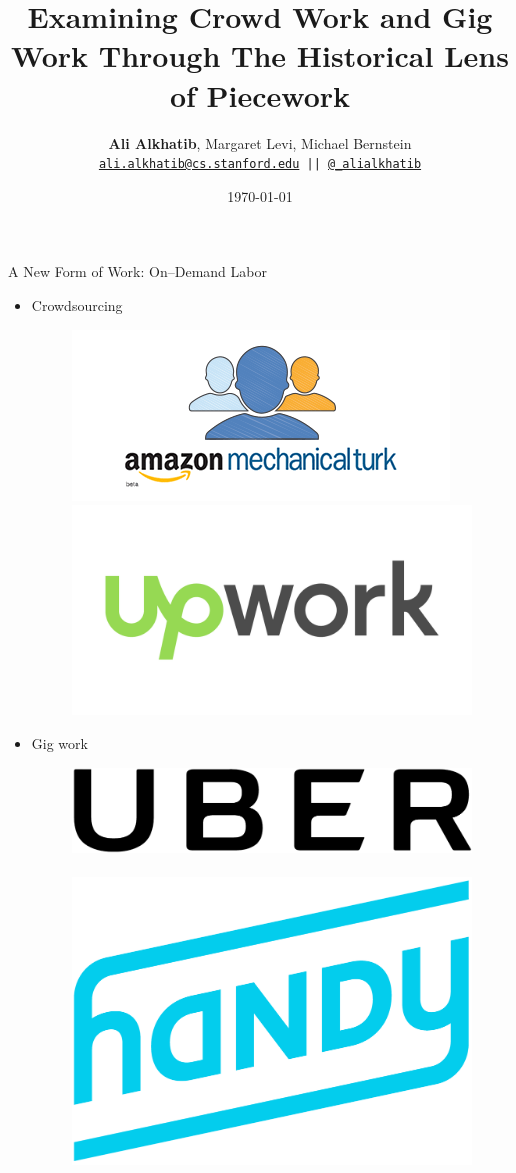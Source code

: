 \documentclass{beamer}
\title{Examining Crowd Work and Gig Work Through The Historical Lens of Piecework}
\author{\textbf{Ali Alkhatib}, Margaret Levi, Michael Bernstein\\
\texttt{ \href{mailto:ali.alkhatib@cs.stanford.edu}{ali.alkhatib@cs.stanford.edu} ||
         \href{http://twitter.com/_alialkhatib}{@\_alialkhatib} }}
\institute[Stanford]{Stanford University}
\date{\today}
\begin{document}
\begin{frame}
\titlepage
\end{frame}

\begin{frame}{A New Form of Work: On--Demand Labor}
  \begin{itemize}[<+- | alert@+>]
    \item Crowdsourcing
    \begin{figure}
    \includegraphics[scale=0.3]{figures/amt.png}
    \includegraphics[scale=0.1]{figures/upwork.png}
    \end{figure}
    \item Gig work
    \begin{figure}
    \includegraphics[scale=0.1]{figures/uber.png}~~~~~
    \includegraphics[scale=0.15]{figures/handy.png}
    \end{figure}
  \end{itemize}
\end{frame}
\end{document}
